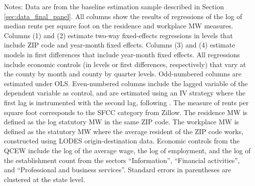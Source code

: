 \begin{table}[hbt!]
\begin{tabular}{@{}lcccc@{}}
    \end{tabular}

    \begin{minipage}{.95\textwidth} \footnotesize
        \vspace{2mm}
        Notes: 
        Data are from the baseline estimation sample described in Section 
        \ref{sec:data_final_panel}.
        All columns show the results of regressions of the log of median rents 
        per square foot on the residence and workplace MW measures.
        Columns (1) and (2) estimate two-way fixed-effects regressions in 
        levels that include ZIP code and year-month fixed effects.
        Columns (3) and (4) estimate models in first differences that include 
        year-month fixed effects.
        All regressions include economic controls (in levels or first differences,
        respectively) that vary at the county by month and county by quarter levels.
        Odd-numbered columns are estimated under OLS.
        Even-numbered columns include the lagged variable of the dependent variable
        as control, and are estimated using an IV strategy where the first lag is 
        instrumented with the second lag, following \textcite{ArellanoBond1991}.
        The measure of rents per square foot corresponds to the SFCC category 
        from Zillow.
        The residence MW is defined as the log statutory MW in the same ZIP code.
        The workplace MW is defined as the statutory MW where the average 
        resident of the ZIP code works, constructed using LODES 
        origin-destination data.
        Economic controls from the QCEW include the log of the average wage, 
        the log of employment, and the log of the establishment count from the 
        sectors ``Information'', ``Financial activities'', and ``Professional
        and business services''.
        Standard errors in parentheses are clustered at the state level.
    \end{minipage}
\end{table}
